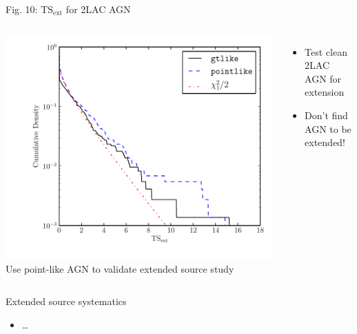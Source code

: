 \documentclass[12pt]{beamer}
\begin{document}
\begin{frame}{Fig. 10: $\text{TS}_\text{ext}$ for 2LAC AGN}
  \begin{columns}
    \includegraphics[scale=0.4]{plots/agn_color.pdf}
Use point-like AGN to validate extended source study
    \begin{itemize}
      \item Test clean 2LAC AGN for extension
      \item Don't find AGN to be extended!
    \end{itemize}
  \end{columns}
\end{frame}

\begin{frame}{Extended source systematics}
  \begin{itemize}
    \item \dots
  \end{itemize}
\end{frame}
\end{document}

